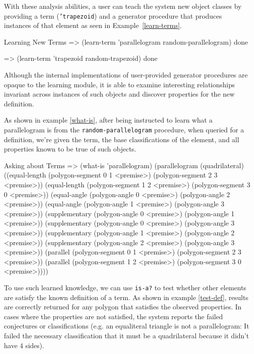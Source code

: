 With these analysis abilities, a user can teach the system new object
classes by providing a term (\texttt{'trapezoid}) and a generator
procedure that produces instances of that element as seen in
Example~\ref{learn-terms}.

\begin{repl-example}
[label=learn-terms]
{Learning New Terms}
=> (learn-term 'parallelogram random-parallelogram)
done

=> (learn-term 'trapezoid random-trapezoid)
done
\end{repl-example}

Although the internal implementations of user-provided generator
procedures are opaque to the learning module, it is able to examine
interesting relationships invariant across instances of such objects
and discover properties for the new definition.

As shown in example \ref{what-is}, after being instructed to learn
what a parallelogram is from the \texttt{random-parallelogram}
procedure, when queried for a definition, we're given the term, the
base classifications of the element, and all properties known to be
true of such objects.

\begin{repl-example}
[label=what-is]
{Asking about Terms}
=> (what-is 'parallelogram)
(parallelogram
 (quadrilateral)
 ((equal-length (polygon-segment 0 1 <premise>)
                (polygon-segment 2 3 <premise>))
  (equal-length (polygon-segment 1 2 <premise>)
                (polygon-segment 3 0 <premise>))
  (equal-angle (polygon-angle 0 <premise>)
               (polygon-angle 2 <premise>))
  (equal-angle (polygon-angle 1 <premise>)
               (polygon-angle 3 <premise>))
  (supplementary (polygon-angle 0 <premise>)
                 (polygon-angle 1 <premise>))
  (supplementary (polygon-angle 0 <premise>)
                 (polygon-angle 3 <premise>))
  (supplementary (polygon-angle 1 <premise>)
                 (polygon-angle 2 <premise>))
  (supplementary (polygon-angle 2 <premise>)
                 (polygon-angle 3 <premise>))
  (parallel (polygon-segment 0 1 <premise>)
            (polygon-segment 2 3 <premise>))
  (parallel (polygon-segment 1 2 <premise>)
            (polygon-segment 3 0 <premise>))))
\end{repl-example}


To use such learned knowledge, we can use \texttt{is-a?} to test
whether other elements are satisfy the known definition of a term. As
shown in example \ref{test-def}, results are correctly returned for
any polygon that satisfies the observed properties. In cases where the
properties are not satisfied, the system reports the failed
conjectures or classifications (e.g. an equaliteral triangle is not a
parallelogram: It failed the necessary classification that it must be
a quadrilateral because it didn't have 4 sides).

